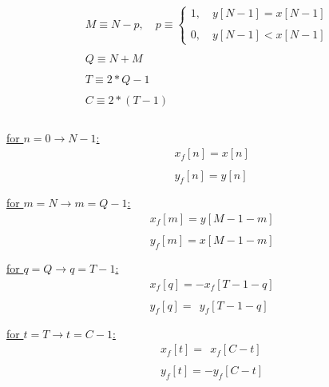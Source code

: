 \documentclass{article}
\begin{document}
\begin{enumerate}
          \begin{align*}
                M \equiv N - p, \quad p \equiv \begin{cases}
                                                   1, \quad y[N - 1] = x[N - 1] \\ \\
                                                   0, \quad y[N - 1] < x[N - 1]
                                                 \end{cases} \\ \\
                Q \equiv N + M \\ \\
                T \equiv 2*Q - 1 \\ \\
                C \equiv 2*(T - 1) \\ \\
            \end{align*} 

          \underline{for $n = 0 \rightarrow N - 1$:} \\
            \begin{align*}
                &x_{f}[n] = x[n] \\ \\
                &y_{f}[n] = y[n] \\ \\
              \end{align*}
          \underline{for $m = N \rightarrow m = Q - 1$:} \\
            \begin{align*}
                &x_{f}[m] = y[M - 1 - m] \\ \\
                &y_{f}[m] = x[M - 1 - m] \\ \\
              \end{align*}
          \underline{for $q = Q \rightarrow q = T - 1$:} \\
             \begin{align*}
                &x_{f}[q] =    -x_{f}[T - 1 - q] \\ \\
                &y_{f}[q] = \ \ y_{f}[T - 1 - q] \\ \\
               \end{align*}
          \underline{for $t = T \rightarrow t = C - 1$:} \\
             \begin{align*}
                &x_{f}[t] = \ \ x_{f}[C - t] \\ \\
                &y_{f}[t] =    -y_{f}[C - t] \\ \\
               \end{align*}
\end{enumerate}
\end{document}
